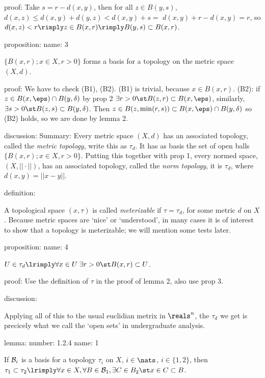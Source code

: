         proof:
            Take $s = r - d(x,y)$, then for all $z \in B(y, s)$, $d(x,z) \le d(x,y) + d(y,z) < d(x,y) + s =$ $ d(x,y) + r - d(x,y) = r$, so $d(x,z) < r \rimply z \in B(x,r) \rimply B(y,s) \subset B(x,r)$.

            
    proposition:
        name:
            3
            
        $\{ B(x, r); x \in X, r>0 \}$ forms a basis for a topology on the metric space $(X, d)$.
            
        proof:
            We have to check (B1), (B2). (B1) is trivial, because $x \in B(x,r)$. (B2): if $ z \in B(x,\eps) \cap B(y,\delta)$ by prop 2 $\exists r>0 \st B(z,r) \subset B(x,\eps)$, similarly, $\exists s>0 \st B(z,s) \subset B(y,\delta)$. Then $z \in B(z, \min(r,s)) \subset B(x,\eps) \cap B(y,\delta)$ so (B2) holds, so we are done by lemma 2.
        
    discussion:
        Summary: Every metric space $(X, d)$ has an associated topology, called the \emph{metric topology}, write this as $\tau_d$. It has as basis the set of open balls $\{ B(x, r); x \in X, r>0 \}$. Putting this together with prop 1, every normed space, $(X, || \cdot ||)$, has an associated topology, called the \emph{norm topology}, it is $\tau_d$, where $d(x,y) = ||x-y||$.
        
    definition:
    
    A topological space $(x, \tau)$ is called \emph{meterizable} if $\tau = \tau_d$, for some metric $d$ on $X$. Because metric spaces are `nice' or `understood', in many cases it is of interest to show that a topology is meterizable; we will mention some tests later.
    
    proposition:
        name:
            4
        
        $U \in \tau_d \lrimply \forall x \in U \; \exists r>0 \st B(x,r) \subset U$.

        proof:
            Use the definition of $\tau$ in the proof of lemma 2, also use prop 3.

    discussion:
    
        Applying all of this to the usual euclidian metrix in $\reals^n$, the $\tau_d$ we get is precicely what we call the `open sets' in undergraduate analysis.
        
    lemma:
        number:
            1.2.4
        name:
            1
        
        If $\mathcal{B}_i$ is a basis for a topology $\tau_i$ on $X$, $i \in \nats$, $i \in \{1,2\}$, then $\tau_1 \subset \tau_2 \lrimply \forall x \in X, \forall B \in \B_1, \exists C \in B_2 \st x \in C \subset B$.


